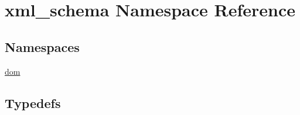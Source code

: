 \hypertarget{namespacexml__schema}{}\section{xml\+\_\+schema Namespace Reference}
\label{namespacexml__schema}
\subsection*{Namespaces}
\begin{DoxyCompactItemize}
\item 
 \hyperlink{namespacexml__schema_1_1dom}{dom}
\end{DoxyCompactItemize}
\subsection*{Typedefs}
